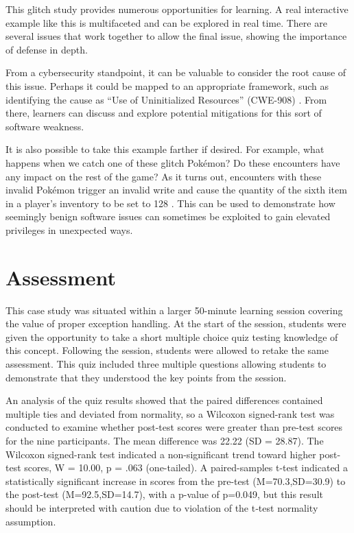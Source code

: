 \documentclass[letterpaper]{article}
\begin{document}
This glitch study provides numerous opportunities for learning. A real interactive example like this is multifaceted and can be explored in real time. There are several issues that work together to allow the final issue, showing the importance of defense in depth.

From a cybersecurity standpoint, it can be valuable to consider the root cause of this issue. Perhaps it could be mapped to an appropriate framework, such as identifying the cause as ``Use of Uninitialized Resources'' (CWE-908) \cite{mitre2012}. From there, learners can discuss and explore potential mitigations for this sort of software weakness.

It is also possible to take this example farther if desired. For example, what happens when we catch one of these glitch Pokémon? Do these encounters have any impact on the rest of the game? As it turns out, encounters with these invalid Pokémon trigger an invalid write and cause the quantity of the sixth item in a player's inventory to be set to 128 \cite{bulbapedia2010}. This can be used to demonstrate how seemingly benign software issues can sometimes be exploited to gain elevated privileges in unexpected ways.

\section{Assessment}
This case study was situated within a larger 50-minute learning session covering the value of proper exception handling. At the start of the session, students were given the opportunity to take a short multiple choice quiz testing knowledge of this concept. Following the session, students were allowed to retake the same assessment. This quiz included three multiple questions allowing students to demonstrate that they understood the key points from the session.

An analysis of the quiz results showed that the paired differences contained multiple ties and deviated from normality, so a Wilcoxon signed-rank test was conducted to examine whether post-test scores were greater than pre-test scores for the nine participants. The mean difference was 22.22 (SD = 28.87). The Wilcoxon signed-rank test indicated a non-significant trend toward higher post-test scores, W = 10.00, p = .063 (one-tailed). A paired-samples t-test indicated a statistically significant increase in scores from the pre-test (M=70.3,SD=30.9) to the post-test (M=92.5,SD=14.7), with a p-value of p=0.049, but this result should be interpreted with caution due to violation of the t‑test normality assumption.
\end{document}
